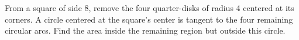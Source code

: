 From a square of side 8, remove the four quarter-disks of radius 4 centered at its corners. A circle centered at the square's center is tangent to the four remaining circular arcs. Find the area inside the remaining region but outside this circle.
